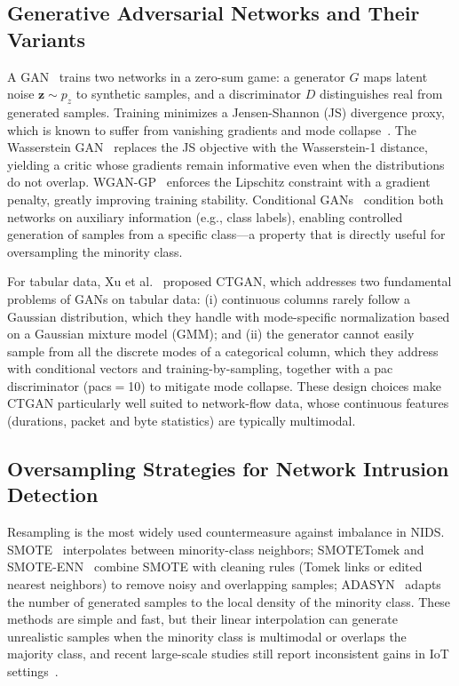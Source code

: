 ﻿\documentclass[journal]{IEEEtran}
\begin{document}
\subsection{Generative Adversarial Networks and Their Variants}
\label{sec:ganfamily}
A GAN~\cite{goodfellow2014gan} trains two networks in a zero-sum game: a generator $G$ maps latent noise $\mathbf{z} \sim p_z$ to synthetic samples, and a discriminator $D$ distinguishes real from generated samples. Training minimizes a Jensen-Shannon (JS) divergence proxy, which is known to suffer from vanishing gradients and mode collapse~\cite{arjovsky2017wgan}. The Wasserstein GAN~\cite{arjovsky2017wgan} replaces the JS objective with the Wasserstein-1 distance, yielding a critic whose gradients remain informative even when the distributions do not overlap. WGAN-GP~\cite{gulrajani2017wgangp} enforces the Lipschitz constraint with a gradient penalty, greatly improving training stability. Conditional GANs~\cite{mirza2014cgan} condition both networks on auxiliary information (e.g., class labels), enabling controlled generation of samples from a specific class---a property that is directly useful for oversampling the minority class.

For tabular data, Xu et al.~\cite{xu2019ctgan} proposed CTGAN, which addresses two fundamental problems of GANs on tabular data: (i) continuous columns rarely follow a Gaussian distribution, which they handle with mode-specific normalization based on a Gaussian mixture model (GMM); and (ii) the generator cannot easily sample from all the discrete modes of a categorical column, which they address with conditional vectors and training-by-sampling, together with a pac discriminator (pacs$=$10) to mitigate mode collapse. These design choices make CTGAN particularly well suited to network-flow data, whose continuous features (durations, packet and byte statistics) are typically multimodal.

\subsection{Oversampling Strategies for Network Intrusion Detection}
Resampling is the most widely used countermeasure against imbalance in NIDS. SMOTE~\cite{chawla2002smote} interpolates between minority-class neighbors; SMOTETomek and SMOTE-ENN~\cite{batista2004smoteenn} combine SMOTE with cleaning rules (Tomek links or edited nearest neighbors) to remove noisy and overlapping samples; ADASYN~\cite{he2008adasyn} adapts the number of generated samples to the local density of the minority class. These methods are simple and fast, but their linear interpolation can generate unrealistic samples when the minority class is multimodal or overlaps the majority class, and recent large-scale studies still report inconsistent gains in IoT settings~\cite{talukder2024mlstl,albasheer2024jaya,talukder2024jbigdata}.
\end{document}
